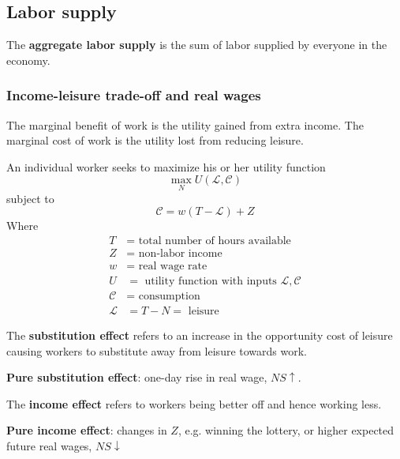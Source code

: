 \subsection{Labor supply}

\begin{definition}
    The \textbf{aggregate labor supply} is the sum of labor supplied by everyone in the economy.
\end{definition}

\subsubsection{Income-leisure trade-off and real wages}

The marginal benefit of work is the utility gained from extra income. The marginal cost of work is the utility lost from reducing leisure. 

\begin{definition}
    An individual worker seeks to maximize his or her utility function
    \[
    \max_{N} U(\mathcal{L}, \mathcal{C})
    \]
    subject to 
    \[
        \mathcal{C} = w(T - \mathcal{L}) + Z
    \]
    Where 
    \begin{align*}
        T &= \text{ total number of hours available} \\
        Z &= \text{ non-labor income} \\
        w &= \text{ real wage rate} \\
        U &= \text{ utility function with inputs $\mathcal{L}, \mathcal{C}$} \\
        \mathcal{C} &= \text{ consumption} \\
        \mathcal{L} &= T - N = \text{ leisure }
    \end{align*}
\end{definition}

\begin{definition}
    The \textbf{substitution effect} refers to an increase in the opportunity cost of leisure causing workers to substitute away from leisure towards work.
\end{definition}

\begin{remark}
    \textbf{Pure substitution effect}: one-day rise in real wage, $NS \uparrow$.  \\
\end{remark}

\begin{definition}
    The \textbf{income effect} refers to workers being better off and hence working less.
\end{definition}
\begin{remark}
    \textbf{Pure income effect}: changes in $Z$, e.g. winning the lottery, or higher expected future real wages, $NS \downarrow$ \\
\end{remark}


